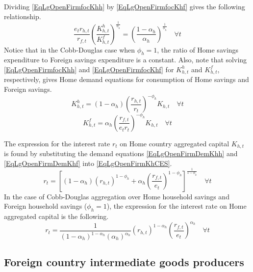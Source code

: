     Dividing \eqref{EqLgOpenFirmfocKhh} by \eqref{EqLgOpenFirmfocKhf} gives the following relationship.
    \begin{equation}\label{EqLgOpenFirmFracCapDomFor}
      \frac{e_t r_{h,t}}{r_{f,t}}\left(\frac{K^h_{h,t}}{K^f_{h,t}}\right)^{\frac{1}{\phi_h}} = \left(\frac{1-\alpha_h}{\alpha_h}\right)^{\frac{1}{\phi_h}} \quad\forall t
    \end{equation}
    Notice that in the Cobb-Douglas case when $\phi_h=1$, the ratio of Home savings expenditure to Foreign savings expenditure is a constant. Also, note that solving \eqref{EqLgOpenFirmfocKhh} and \eqref{EqLgOpenFirmfocKhf} for $K^h_{h,t}$ and $K^f_{h,t}$, respectively, gives Home demand equations for consumption of Home savings and Foreign savings.
    \begin{equation}\label{EqLgOpenFirmDemKhh}
      K^h_{h,t} = (1-\alpha_h)\left(\frac{r_{h,t}}{r_t}\right)^{-\phi_h}K_{h,t} \quad\forall t
    \end{equation}
    \begin{equation}\label{EqLgOpenFirmDemKhf}
      K^f_{h,t} = \alpha_h \left(\frac{r_{f,t}}{e_t r_t}\right)^{-\phi_h}K_{h,t} \quad\forall t
    \end{equation}

    The expression for the interest rate $r_t$ on Home country aggregated capital $K_{h,t}$ is found by substituting the demand equations \eqref{EqLgOpenFirmDemKhh} and \eqref{EqLgOpenFirmDemKhf} into \eqref{EqLgOpenFirmKhCES}.
    \begin{equation}\label{EqLgOpenFirmAggR_h}
      r_t = \left[(1-\alpha_h)\left(r_{h,t}\right)^{1-\phi_h} + \alpha_h\left(\frac{r_{f,t}}{e_t}\right)^{1-\phi_h}\right]^{\frac{1}{1-\phi_h}} \quad\forall t
    \end{equation}
    In the case of Cobb-Douglas aggregation over Home household savings and Foreign household savings ($\phi_h=1$), the expression for the interest rate on Home aggregated capital is the following.
    \begin{equation}\label{EqLgOpenFirmAggR_h_Cobb}
      r_t = \frac{1}{(1-\alpha_h)^{1-\alpha_h}(\alpha_h)^{\alpha_h}} \left(r_{h,t}\right)^{1-\alpha_h}\left(\frac{r_{f,t}}{e_t}\right)^{\alpha_h} \quad\forall t
    \end{equation}


  \subsection{Foreign country intermediate goods producers}\label{SecLgOpenFirmIntd_F}

